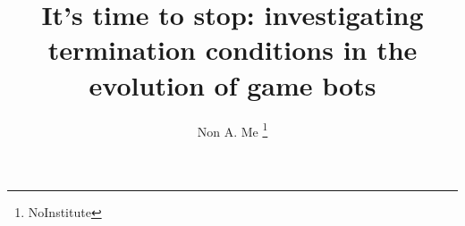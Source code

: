 \documentclass[runningheads,a4paper]{llncs}
\begin{document}
\mainmatter  %

\title{It's time to stop: investigating termination conditions in the evolution of game bots}


%
%
\author{Non A. Me%
\thanks{NoInstitute}}
%


%
%

\maketitle
\end{document}
